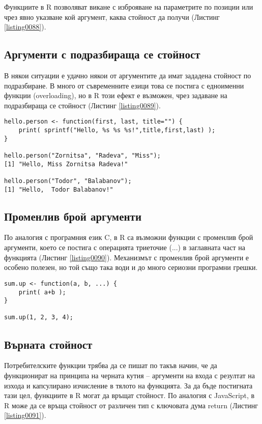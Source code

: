 Функциите в R позволяват викане с изброяване на параметрите по позиции или чрез явно указване кой аргумент, каква стойност да получи (Листинг \ref{listing0088}).

\subsection{Аргументи с подразбираща се стойност}

В някои ситуации е удачно някои от аргументите да имат зададена стойност по подразбиране. В много от съвременните езици това се постига с едноименни функции (overloading), но в R този ефект е възможен, чрез задаване на подразбираща се стойност (Листинг \ref{listing0089}).

\begin{lstlisting}[caption=Извикване на функция с подразбиращи се аргументи, label=listing0089]
hello.person <- function(first, last, title="") {
	print( sprintf("Hello, %s %s %s!",title,first,last) );
}

hello.person("Zornitsa", "Radeva", "Miss");
[1] "Hello, Miss Zornitsa Radeva!"

hello.person("Todor", "Balabanov");
[1] "Hello,  Todor Balabanov!"
\end{lstlisting}

\subsection{Променлив брой аргументи}

По аналогия с програмния език C, в R са възможни функции с променлив брой аргументи, което се постига с операцията триеточие (...) в заглавната част на функцията (Листинг \ref{listing0090}). Механизмът с променлив брой аргументи е особено полезен, но той също така води и до много сериозни програмни грешки.

\begin{lstlisting}[caption=Функция с променлив брой аргументи, label=listing0090]
sum.up <- function(a, b, ...) {
	print( a+b );
}

sum.up(1, 2, 3, 4);
\end{lstlisting}

\subsection{Върната стойност}

Потребителските функции трябва да се пишат по такъв начин, че да функционират на принципа на черната кутия – аргументи на входа с резултат на изхода и капсулирано изчисление в тялото на функцията. За да бъде постигната тази цел, функциите в R могат да връщат стойност. По аналогия с JavaScript, в R може да се връща стойност от различен тип с ключовата дума return (Листинг \ref{listing0091}).


